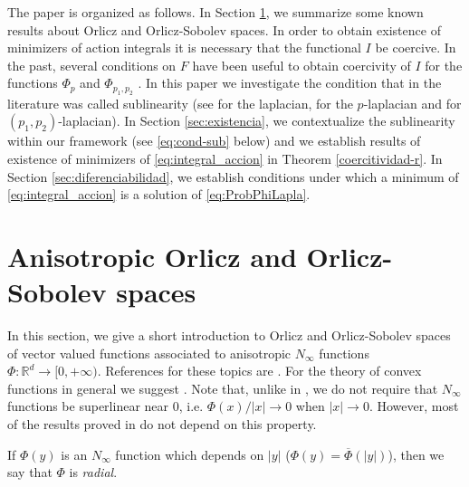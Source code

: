 \documentclass[twoside]{article}
\theoremstyle{remark}
\newcommand{\rr}{\mathbb{R}}
\begin{document}
The paper is organized as follows. In Section \ref{sec:preliminares},  we summarize some known results about Orlicz and Orlicz-Sobolev spaces. In order to obtain existence of minimizers of action integrals it is necessary that the functional $I$ be coercive. 
In the past, several conditions on $F$ have been useful to obtain coercivity of $I$ for the functions  $\Phi_p$ and $\Phi_{p_1,p_2}$ . 
In this paper  we investigate the condition that in the literature was called sublinearity 
(see \cite{tang1998periodic,wu1999periodic,zhao2004periodic} for the laplacian, \cite{li2015infinitely,tang2010periodic} for the $p$-laplacian and \cite{li2014periodic,pasca2010periodic,pacsca2010some,yang2013existence} for $(p_1,p_2)$-laplacian). In Section \ref{sec:existencia},  we contextualize the sublinearity within our framework (see \eqref{eq:cond-sub} below) and we  establish results of existence of minimizers of \eqref{eq:integral_accion}  in Theorem \ref{coercitividad-r}.   In  Section \ref{sec:diferenciabilidad},  we establish conditions under which a minimum of \eqref{eq:integral_accion}  is a solution of \eqref{eq:ProbPhiLapla}.

   










\section{Anisotropic Orlicz and Orlicz-Sobolev spaces}\label{sec:preliminares}

In this section, we give a short introduction to  Orlicz and Orlicz-Sobolev spaces of vector valued functions associated to anisotropic $N_{\infty}$ functions $\Phi:\rr^d\to[0,+\infty)$.  References for  these topics are \cite{chamra2017anisotropic,cianchi2000fully,cianchi2004optimal,Desch2001,gwiazda2013anisotropic,Orliczvectorial2005,Skaff1969,trudinger1974imbedding}. For the theory of convex functions in general we suggest \cite{clarke2013functional}. 
Note that, unlike in \cite{gwiazda2013anisotropic}, we do not require that $N_{\infty}$ functions be superlinear near  0, i.e. $\Phi(x)/|x|\to 0$ when $|x|\to 0$. However, most of the results proved in \cite{gwiazda2013anisotropic} do not depend on this property. 

If $\Phi(y)$ is an $N_{\infty}$  function which depends on $|y|$ ($\Phi(y)=\overline{\Phi}(|y|)$), then we say that $\Phi$ is \emph{radial}. 
\end{document}
